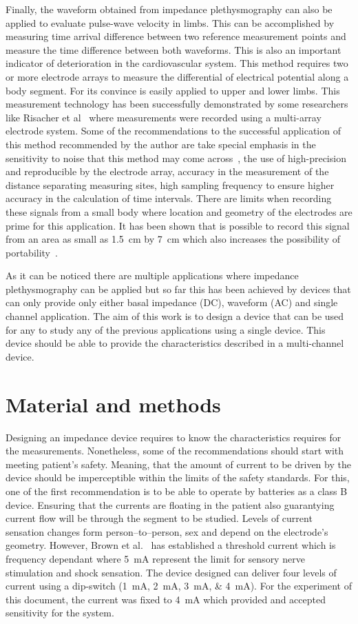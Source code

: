 Finally, the waveform obtained from impedance plethysmography can also be applied to evaluate pulse-wave velocity in limbs. This can be accomplished by measuring time arrival difference between two reference measurement points and measure the time difference between both waveforms. This is also an important indicator of deterioration in the cardiovascular system. This method requires two or more electrode arrays to measure the differential of electrical potential along a body segment. For its convince is easily applied to upper and lower limbs. This measurement technology has been successfully demonstrated by some researchers like Risacher et al~\cite{risacher1993impedance} where measurements were recorded using a multi-array electrode system. Some of the recommendations to the successful application of this method recommended by the author are take special emphasis in the sensitivity to noise that this method may come across~\cite{risacher1992computation}, the use of high-precision and reproducible by the electrode array, accuracy in the measurement of the distance separating measuring sites, high sampling frequency to ensure higher accuracy in the calculation of time intervals. There are limits when recording these signals from a small body where location and geometry of the electrodes are prime for this application. It has been shown that is possible to record this signal from an area as small as \SI{1.5}{\cm} by \SI{7}{\cm} which also increases the possibility of portability~\cite{cho2009bio}. 

As it can be noticed there are multiple applications where impedance plethysmography can be applied but so far this has been achieved by devices that can only provide only either basal impedance (DC), waveform (AC) and single channel application. The aim of this work is to design a device that can be used for any to study any of the previous applications using a single device. This device should be able to provide the characteristics described in a multi-channel device.  


\section{Material and methods}
Designing an impedance device requires to know the characteristics requires for the measurements. Nonetheless, some of the recommendations should start with meeting patient's safety. Meaning, that the amount of current to be driven by the device should be imperceptible within the limits of the safety standards. For this, one of the first recommendation is to be able to operate by batteries as a class B device. Ensuring that the currents are floating in the patient also guarantying current flow will be through the segment to be studied. Levels of current sensation changes form person–to–person, sex and depend on the electrode's geometry. However, Brown et al.~\cite{brown1998medical} has established a threshold current which is frequency dependant where \SI{5}{\mA} represent the limit for sensory nerve stimulation and shock sensation. The device designed can deliver four levels of current using a dip-switch (\SIlist{1;2;3;4}{\mA}). For the experiment of this document, the current was fixed to \SI{4}{\mA} which provided and accepted sensitivity for the system. 

